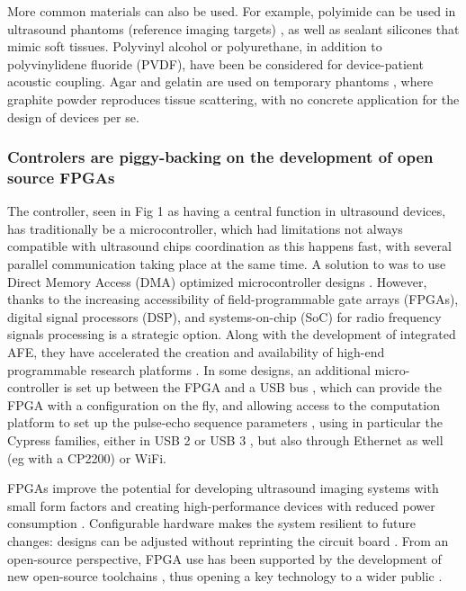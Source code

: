 \documentclass{article}
\begin{document}
More common materials can also be used. For example, polyimide can be used in ultrasound phantoms (reference imaging targets) \cite{xu_high-frequency_2008, lei_sun_high-frame_2008}, as well as sealant silicones \cite{lorenzo_experimental_2009} that mimic soft tissues. Polyvinyl alcohol or polyurethane, in addition to polyvinylidene fluoride (PVDF), have been be considered \cite{sikdar_novel_2014}  for device-patient acoustic coupling. Agar and gelatin are used on temporary phantoms \cite{vogt_development_2005,chun_ultrasound_2015}, where graphite powder reproduces tissue scattering, with no concrete application for the design of devices per se. 

\subsubsection{Controlers are piggy-backing on the development of open source FPGAs}

The controller, seen in Fig 1 as having a central function in ultrasound devices, has traditionally be a microcontroller, which had limitations not always compatible with ultrasound chips coordination as this happens fast, with several parallel communication taking place at the same time. A solution to was to use Direct Memory Access (DMA) optimized microcontroller designs \cite{kidav_architecture_2019}. However, thanks to the increasing accessibility of field-programmable gate arrays (FPGAs), digital signal processors (DSP), and systems-on-chip (SoC) for radio frequency signals processing is a strategic option. Along with the development of integrated AFE, they have accelerated the creation and availability of high-end programmable research platforms  \cite{roman_open-source_2018}.  In some designs, an additional micro-controller is set up between the FPGA and a USB bus \cite{pashaei_live_2018, schneider_fully_2010}, which can provide the FPGA with a configuration on the fly, and allowing access to the computation platform to set up the pulse-echo sequence parameters \cite{raj_microcontroller_2017, raj_8051_2016}, using in particular the Cypress families, either in USB 2 \cite{hu_design_2011,richard_low-cost_2008} or USB 3 \cite{lewandowski_low-cost_2012,qiu_delayed-excitation_2018,qiu_ultrasound_2020,ahn_smartphone-based_2015}, but also through Ethernet as well (eg with a CP2200) or WiFi.

FPGAs improve the potential for developing ultrasound imaging systems with small form factors and creating high-performance devices with reduced power consumption \cite{dusa_low_2014}. Configurable hardware makes the system resilient to future changes: designs can be adjusted without reprinting the circuit board \cite{zhang_fpga_2012, qiu_programmable_2010, ibrahim_single-fpga_2017}. From an open-source perspective, FPGA use has been supported by the development of new open-source toolchains \cite{shah_yosys+nextpnr:_2019}, thus opening a key technology to a wider public \cite{saiz-vela_low-cost_2020}.
\end{document}
